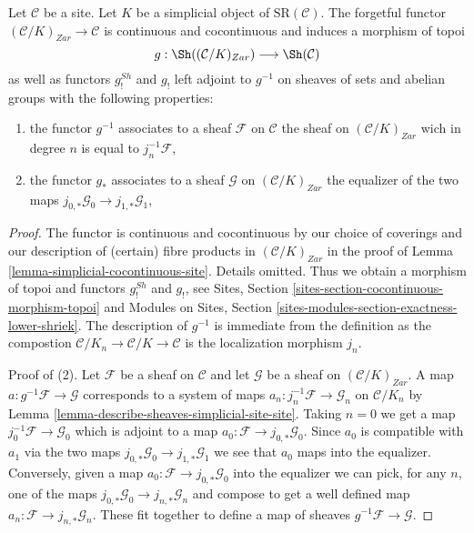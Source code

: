\begin{lemma}
\label{lemma-comparison}
Let $\mathcal{C}$ be a site. Let $K$ be a simplicial object of
$\text{SR}(\mathcal{C})$. The forgetful functor
$(\mathcal{C}/K)_{Zar} \to \mathcal{C}$ is continuous and cocontinuous
and induces a morphism of topoi
$$
g : \Sh((\mathcal{C}/K)_{Zar}) \longrightarrow \Sh(\mathcal{C})
$$
as well as functors $g^{Sh}_!$ and $g_!$ left adjoint to $g^{-1}$
on sheaves of sets and abelian groups with the following properties:
\begin{enumerate}
\item the functor $g^{-1}$ associates to a sheaf $\mathcal{F}$ on
$\mathcal{C}$ the sheaf on $(\mathcal{C}/K)_{Zar}$ wich in degree $n$
is equal to $j_n^{-1}\mathcal{F}$,
\item the functor $g_*$ associates to a sheaf $\mathcal{G}$ on
$(\mathcal{C}/K)_{Zar}$ the equalizer of the two maps
$j_{0, *}\mathcal{G}_0 \to j_{1, *}\mathcal{G}_1$,
\end{enumerate}
\end{lemma}

\begin{proof}
The functor is continuous and cocontinuous by our choice of coverings and
our description of (certain) fibre products in $(\mathcal{C}/K)_{Zar}$
in the proof of Lemma \ref{lemma-simplicial-cocontinuous-site}. Details omitted.
Thus we obtain a morphism of topoi and functors $g^{Sh}_!$ and $g_!$, see
Sites, Section \ref{sites-section-cocontinuous-morphism-topoi} and
Modules on Sites, Section
\ref{sites-modules-section-exactness-lower-shriek}.
The description of $g^{-1}$ is immediate from the definition as the
compostion $\mathcal{C}/K_n \to \mathcal{C}/K \to \mathcal{C}$ is
the localization morphism $j_n$.

\medskip\noindent
Proof of (2). Let $\mathcal{F}$ be a sheaf on $\mathcal{C}$ and let
$\mathcal{G}$ be a sheaf on $(\mathcal{C}/K)_{Zar}$. A map
$a : g^{-1}\mathcal{F} \to \mathcal{G}$ corresponds to a system of maps
$a_n : j_n^{-1}\mathcal{F} \to \mathcal{G}_n$ on $\mathcal{C}/K_n$
by Lemma \ref{lemma-describe-sheaves-simplicial-site-site}.
Taking $n = 0$ we get a map $j_0^{-1}\mathcal{F} \to \mathcal{G}_0$
which is adjoint to a map $a_0 : \mathcal{F} \to j_{0, *}\mathcal{G}_0$.
Since $a_0$ is compatible with $a_1$ via the two maps
$j_{0, *}\mathcal{G}_0 \to j_{1, *}\mathcal{G}_1$ we see that
$a_0$ maps into the equalizer. Conversely, given a map
$a_0 : \mathcal{F} \to j_{0, *}\mathcal{G}_0$ into the equalizer
we can pick, for any $n$, one of the maps
$j_{0, *}\mathcal{G}_0 \to j_{n, *}\mathcal{G}_n$ and compose
to get a well defined map $a_n : \mathcal{F} \to j_{n, *}\mathcal{G}_n$.
These fit together to define a map of sheaves
$g^{-1}\mathcal{F} \to \mathcal{G}$.
\end{proof}


